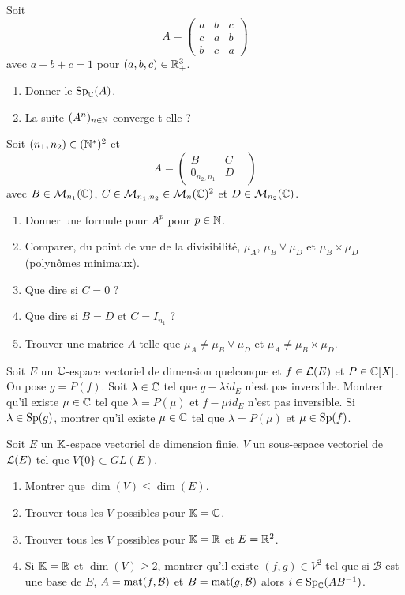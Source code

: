 \documentclass[12pt]{article}
\begin{document}
\begin{exercise}
	Soit 
	$$
	A=
	\begin{pmatrix}
		a & b & c\\
		c & a & b\\
		b & c & a
	\end{pmatrix}
	$$
	avec $a+b+c=1$ pour $(a,b,c)\in\mathbb{R}_{+}^{3}$.
	\begin{enumerate}
		\item Donner le $\operatorname{Sp}_{\mathbb{C}}(A)$.
		\item La suite $(A^{n})_{n\in\mathbb{N}}$ converge-t-elle ?
	\end{enumerate}
\end{exercise}

\begin{exercise}
	Soit $(n_{1},n_{2})\in(\mathbb{N}^{*})^{2}$ et
	$$
	A=
	\begin{pmatrix}
		B & C &\\
		0_{n_{2},n_{1}} & D
	\end{pmatrix}
	$$
	avec $B\in\mathcal{M}_{n_{1}}(\mathbb{C})$, $C\in\mathcal{M}_{n_{1},n_{2}}\in\mathcal{M}_{n}(\mathbb{C})^{2}$ et $D\in\mathcal{M}_{n_{2}}(\mathbb{C})$.
	\begin{enumerate}
		\item Donner une formule pour $A^{p}$ pour $p\in\mathbb{N}$.
		\item Comparer, du point de vue de la divisibilité, $\mu_{A}$, $\mu_{B}\vee\mu_{D}$ et $\mu_{B}\times\mu_{D}$ (polynômes minimaux).
		\item Que dire si $C=0$ ?
		\item Que dire si $B=D$ et $C=I_{n_{1}}$ ?
		\item Trouver une matrice $A$ telle que $\mu_{A}\neq \mu_{B}\vee\mu_{D}$ et $\mu_{A}\neq \mu_{B}\times\mu_{D}$.
	\end{enumerate}
\end{exercise}

\begin{exercise}
	Soit $E$ un $\mathbb{C}$-espace vectoriel de dimension quelconque et $f\in\mathcal{L}(E)$ et $P\in\mathbb{C}[X]$. On pose $g=P(f)$. Soit $\lambda\in\mathbb{C}$ tel que $g-\lambda id_{E}$ n'est pas inversible. Montrer qu'il existe $\mu\in\mathbb{C}$ tel que $\lambda=P(\mu)$ et $f-\mu id_{E}$ n'est pas inversible. Si $\lambda\in\operatorname{Sp}(g)$, montrer qu'il existe $\mu\in\mathbb{C}$ tel que $\lambda=P(\mu)$ et $\mu\in\operatorname{Sp}(f)$.
\end{exercise}

\begin{exercise}
	Soit $E$ un $\mathbb{K}$-espace vectoriel de dimension finie, $V$ un sous-espace vectoriel de $\mathcal{L}(E)$ tel que $V\{0\}\subset GL(E)$.
	\begin{enumerate}
		\item Montrer que $\dim(V)\leqslant\dim(E)$.
		\item Trouver tous les $V$ possibles pour $\mathbb{K}=\mathbb{C}$.
		\item Trouver tous les $V$ possibles pour $\mathbb{K}=\mathbb{R}$ et $E=\mathbb{R}^{2}$.
		\item Si $\mathbb{K}=\mathbb{R}$ et $\dim(V)\geqslant2$, montrer qu'il existe $(f,g)\in V^{2}$ tel que si $\mathcal{B}$ est une base de $E$, $A=\operatorname{mat}(f,\mathcal{B})$ et $B=\operatorname{mat}(g,\mathcal{B})$ alors $i\in\operatorname{Sp}_{\mathbb{C}}(AB^{-1})$.
	\end{enumerate}
\end{exercise}
\end{document}
